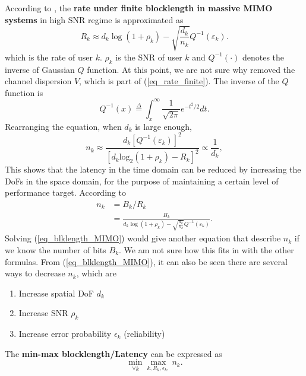 \documentclass[a4paper, 12pt, onecolumn, journal, twoside, draftclsnofoot]{IEEEtran}
\begin{document}
According to \cite{you2023}, the \textbf{rate under finite blocklength in massive MIMO systems} in high SNR regime is approximated as 
\begin{equation*}
	R_k \approx d_k\log\left(1+\rho_k\right)-\sqrt{\frac{d_k}{n_k}}Q^{-1}\left(\varepsilon_k\right).
\end{equation*}
which is the rate of user $k$.  $\rho_k$ is the SNR of user $k$ and $Q^{-1}(\cdot)$ denotes the inverse of Gaussian $Q$ function.  At this point, we are not sure why \cite{you2023} removed the channel dispersion $V$, which is part of (\ref{eq_rate_finite}).  The inverse of the $Q$ function is  
\begin{equation*}
	Q^{-1}(x) \overset{\Delta}{\operatorname*{=}}\int_{x}^{\infty}\frac{1}{\sqrt{2\pi}}e^{-t^{2}/2} dt.
\end{equation*}
Rearranging the equation, when $d_k$ is large enough, 
\begin{equation*}
    n_k\approx\frac{d_k\left[Q^{-1}\left(\varepsilon_k\right)\right]^2}{\left[d_k\mathrm{log}_2\left(1+\rho_k\right)-R_k\right]^2}\propto\frac{1}{d_k},
\end{equation*}
This shows that the latency in the time domain can be reduced by increasing the DoFs in the space domain, for the purpose of maintaining a certain level of performance target. According to \cite{you2023} 
\begin{equation}
	\begin{split}
    	n_k &= B_k/R_k \\
		&= \frac{B_k}{d_k\log\left(1+\rho_k\right)-\sqrt{\frac{d_k}{n_k}}Q^{-1}\left(\varepsilon_k\right)}. 
	\end{split}
\label{eq_blklength_MIMO}
\end{equation}
Solving (\ref{eq_blklength_MIMO}) would give another equation that describe $n_k$ if we know the number of bits $B_k$. We am not sure how this fits in with the other formulas.  From (\ref{eq_blklength_MIMO}), it can also be seen there are several ways to decrease $n_k$, which are 
\begin{enumerate}
    \item Increase spatial DoF $d_k$
    \item Increase SNR $\rho_k$
    \item Increase error probability $\epsilon_k$ (reliability)
\end{enumerate}

The \textbf{min-max blocklength/Latency} can be expressed as
\begin{equation*}
    \min_{\forall k}  \max_{k,R_k,\epsilon_k, }  n_k. 
\end{equation*}
\end{document}

